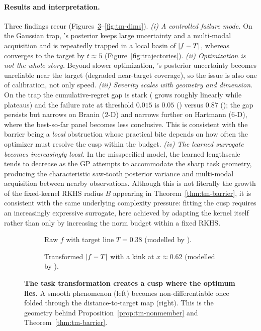 \paragraph{Results and interpretation.}
Three findings recur (Figures~\ref{fig:tm-cusp}--\ref{fig:tm-dims}).
\emph{(i) A controlled failure mode.} On the Gaussian trap, \WRONG{}'s posterior
keeps large uncertainty and a multi-modal acquisition and is repeatedly trapped
in a local basin of $\left\lvert f-T\right\rvert$, whereas \RIGHT{} converges to the target by
$t\approx5$ (Figure~\ref{fig:trajectories}). \emph{(ii) Optimization is not the
whole story.} Beyond slower optimization, \WRONG{}'s posterior uncertainty
becomes unreliable near the target (degraded near-target coverage), so the issue
is also one of calibration, not only speed. \emph{(iii) Severity scales with
geometry and dimension.} On the trap the cumulative-regret gap is stark
(\WRONG{} grows roughly linearly while \RIGHT{} plateaus) and the failure rate at
threshold $0.015$ is $0.05$ (\RIGHT) versus $0.87$ (\WRONG); the gap persists but
narrows on Branin (2-D) and narrows further on Hartmann (6-D), where the
best-so-far panel becomes less conclusive. This is consistent with the barrier being
a \emph{local} obstruction whose practical bite depends on how often the
optimizer must resolve the cusp within the budget. \emph{(iv) The learned
surrogate becomes increasingly local.} In the misspecified model, the learned
lengthscale tends to decrease as the GP attempts to accommodate the sharp task
geometry, producing the characteristic saw-tooth posterior variance and
multi-modal acquisition between nearby observations. Although this is not
literally the growth of the fixed-kernel RKHS radius $B$ appearing in
Theorem~\ref{thm:tm-barrier}, it is consistent with the same underlying
complexity pressure: fitting the cusp requires an increasingly expressive
surrogate, here achieved by adapting the kernel itself rather than only by
increasing the norm budget within a fixed RKHS.




\begin{figure}[htbp]
  \centering
  \begin{subfigure}[b]{0.48\linewidth}
    \centering{}
    \caption{Raw $f$ with target line $T=0.38$ (modelled by \RIGHT).}
    \label{fig:tm-raw}
  \end{subfigure}\hfill
  \begin{subfigure}[b]{0.48\linewidth}
    \centering{}
    \caption{Transformed $\left\lvert f-T\right\rvert$ with a kink at $x\approx0.62$ (modelled by \WRONG).}
    \label{fig:tm-abs}
  \end{subfigure}
  \caption{\textbf{The task transformation creates a cusp where the optimum lies.}
  A smooth phenomenon (left) becomes non-differentiable once folded through the
  distance-to-target map (right). This is the geometry behind
  Proposition~\ref{prop:tm-nonmember} and Theorem~\ref{thm:tm-barrier}.}
  \label{fig:tm-cusp}
\end{figure}

